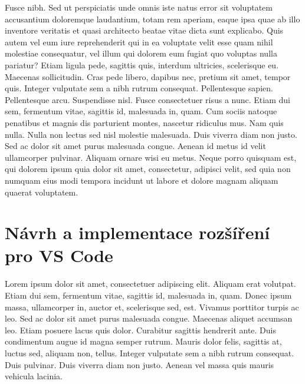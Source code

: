 \documentclass[czech,master,dept460,male,cpp,cpdeclaration]{diploma}
\begin{document}
Fusce nibh. Sed ut perspiciatis unde omnis iste natus error sit voluptatem accusantium doloremque laudantium, totam rem aperiam, eaque ipsa quae ab illo inventore veritatis et quasi architecto beatae vitae dicta sunt explicabo. Quis autem vel eum iure reprehenderit qui in ea voluptate velit esse quam nihil molestiae consequatur, vel illum qui dolorem eum fugiat quo voluptas nulla pariatur? Etiam ligula pede, sagittis quis, interdum ultricies, scelerisque eu. Maecenas sollicitudin. Cras pede libero, dapibus nec, pretium sit amet, tempor quis. Integer vulputate sem a nibh rutrum consequat. Pellentesque sapien. Pellentesque arcu. Suspendisse nisl. Fusce consectetuer risus a nunc. Etiam dui sem, fermentum vitae, sagittis id, malesuada in, quam. Cum sociis natoque penatibus et magnis dis parturient montes, nascetur ridiculus mus. Nam quis nulla. Nulla non lectus sed nisl molestie malesuada. Duis viverra diam non justo. Sed ac dolor sit amet purus malesuada congue. Aenean id metus id velit ullamcorper pulvinar. Aliquam ornare wisi eu metus. Neque porro quisquam est, qui dolorem ipsum quia dolor sit amet, consectetur, adipisci velit, sed quia non numquam eius modi tempora incidunt ut labore et dolore magnam aliquam quaerat voluptatem.

\section{Návrh a implementace rozšíření pro VS Code}
Lorem ipsum dolor sit amet, consectetuer adipiscing elit. Aliquam erat volutpat. Etiam dui sem, fermentum vitae, sagittis id, malesuada in, quam. Donec ipsum massa, ullamcorper in, auctor et, scelerisque sed, est. Vivamus porttitor turpis ac leo. Sed ac dolor sit amet purus malesuada congue. Maecenas aliquet accumsan leo. Etiam posuere lacus quis dolor. Curabitur sagittis hendrerit ante. Duis condimentum augue id magna semper rutrum. Mauris dolor felis, sagittis at, luctus sed, aliquam non, tellus. Integer vulputate sem a nibh rutrum consequat. Duis pulvinar. Duis viverra diam non justo. Aenean vel massa quis mauris vehicula lacinia.
\end{document}
